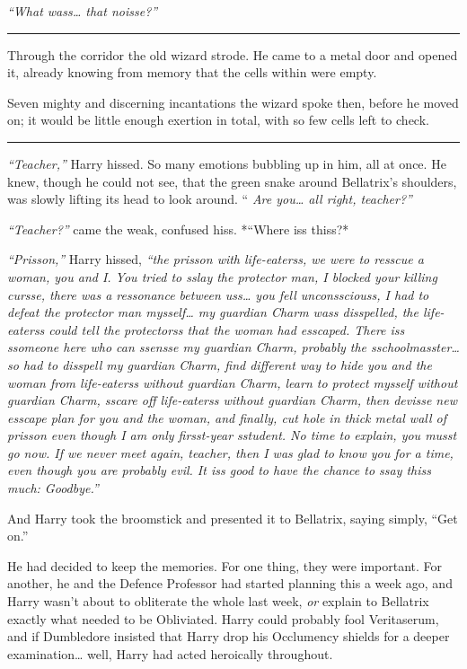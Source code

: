 \emph{``What wass\ldots{} that noisse?''}

\begin{center}\rule{3in}{0.4pt}\end{center}

Through the corridor the old wizard strode. He came to a metal door and
opened it, already knowing from memory that the cells within were empty.

Seven mighty and discerning incantations the wizard spoke then, before
he moved on; it would be little enough exertion in total, with so few
cells left to check.

\begin{center}\rule{3in}{0.4pt}\end{center}

\emph{``Teacher,''} Harry hissed. So many emotions bubbling up in him,
all at once. He knew, though he could not see, that the green snake
around Bellatrix's shoulders, was slowly lifting its head to look
around. `` \emph{Are you\ldots{} all right, teacher?''}

\emph{``Teacher?''} came the weak, confused hiss. *``Where iss thiss?*

\emph{``Prisson,''} Harry hissed, \emph{``the prisson with life-eaterss,
we were to resscue a woman, you and I. You tried to sslay the protector
man, I blocked your killing cursse, there was a ressonance between
uss\ldots{} you fell unconssciouss, I had to defeat the protector man
mysself\ldots{} my guardian Charm wass disspelled, the life-eaterss
could tell the protectorss that the woman had esscaped. There iss
ssomeone here who can ssensse my guardian Charm, probably the
sschoolmasster\ldots{} so had to disspell my guardian Charm, find
different way to hide you and the woman from life-eaterss without
guardian Charm, learn to protect mysself without guardian Charm, sscare
off life-eaterss without guardian Charm, then devisse new esscape plan
for you and the woman, and finally, cut hole in thick metal wall of
prisson even though I am only firsst-year sstudent. No time to explain,
you musst go now. If we never meet again, teacher, then I was glad to
know you for a time, even though you are probably evil. It iss good to
have the chance to ssay thiss much: Goodbye.''}

And Harry took the broomstick and presented it to Bellatrix, saying
simply, ``Get on.''

He had decided to keep the memories. For one thing, they were important.
For another, he and the Defence Professor had started planning this a
week ago, and Harry wasn't about to obliterate the whole last week,
\emph{or} explain to Bellatrix exactly what needed to be Obliviated.
Harry could probably fool Veritaserum, and if Dumbledore insisted that
Harry drop his Occlumency shields for a deeper examination\ldots{} well,
Harry had acted heroically throughout.

